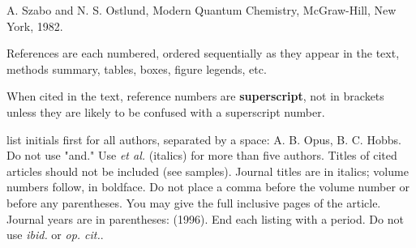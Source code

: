 \newcommand{\bib}{\bibitem}
\def\arpc{Ann. Rev. Phys. Chem.~~}
\def\irpc{Int. Rev. Phys. Chem.~~}
\def\jcp{J. Chem. Phys.~~}
\def\jacs{J. Am. Chem. Soc.~~}
\def\acp{Adv. Chem. Phys.~~}
\def\cp{Chem. Phys.~~}
\def\cpc{Comput. Phys. Commun.~~}
\def\cpr{Comput. Phys. Rep.~~}
\def\csr{Chem. Soc. Rev.~~}
\def\cpl{Chem. Phys. Lett.~~}
\def\cjc{Can. J. Chem.~~}
\def\cs{Curr. Sci.~~}
\def\acr{Acc. Chem. Res.~~}
\def\mph{Mol. Phys.~~}
\def\prl{Phys. Rev. Lett.~~}
\def\jpc{J. Phys. Chem.~~}
\def\joc{J. Org. Chem.~~}
\def\jms{J. Mol.  Structure~~}
\def\josab{J. Opt. Soc. Am. B~~}
\def\jao{J. Appl. Opt.~~}
\def\ijqc{Int. J. Quant. Chem.~~}
\def\sc{Science~~}
\def\tca{Theoret. Chim. Acta~~}
\def\pr{Phys. Rep.~~}
\def\ssr{Surf. Sci. Reports~~}
\def\prb{Phys. Rev. B~~}
\def\pra{Phys. Rev. A~~}
\def\prs{Proc. Roy. Soc.~~}
\def\pias{Proc. Indian Acad. Sci.~~}
\def\rpp{Rep. Prog. Phys.~~}
\def\pla{Phys. Letters A~~}
\def\fdcs{Faraday Discuss. Chem. Soc.~~}
\def\jcsft{J. Chem. Soc. Faraday Trans.~~}
\def\jrs{J. Raman Spectry.~~}
\def\rmp{Rev. Mod. Phys.~~}

\clearpage
{}
\begin{thebibliography}{99}
 A. Szabo and N. S. Ostlund, Modern Quantum Chemistry, McGraw-Hill, New York, 1982.

\end{thebibliography}

\baselineskip 15pt
\setlength{\parskip}{10pt}

\noindent References are each numbered, ordered sequentially as they appear in the text, methods summary, tables, boxes, figure legends, etc. 

\noindent When cited in the text, reference numbers are {\bf superscript}, not in brackets unless they are likely to be confused with a superscript number.


 list initials first for all authors, separated by a space: A. B. Opus, B. C. Hobbs. Do not use "and." Use {\em et al.} (italics) for more than five authors. Titles of cited articles should not be included (see samples). Journal titles are in italics; volume numbers follow, in boldface. Do not place a comma before the volume number or before any parentheses. You may give the full inclusive pages of the article. Journal years are in parentheses: (1996). End each listing with a period. Do not use {\em ibid.} or {\em op. cit.}.

